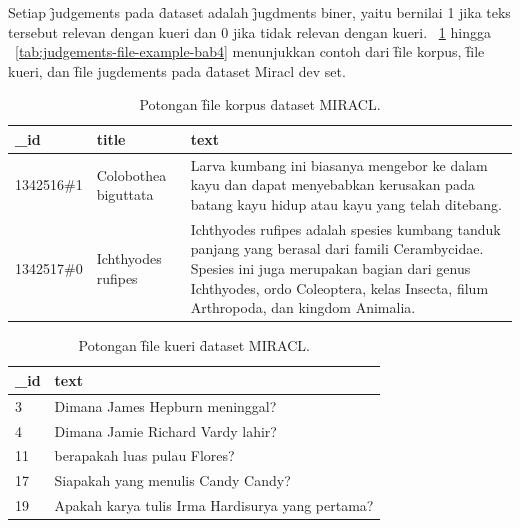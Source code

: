 Setiap \f{judgements} pada \f{dataset} adalah \f{jugdments} biner, yaitu bernilai 1 jika teks tersebut relevan dengan kueri dan 0 jika tidak relevan dengan kueri. \tab~\ref{tab:contoh-file-korpus-bab4} hingga \tab~\ref{tab:judgements-file-example-bab4} menunjukkan contoh dari \f{file} korpus, \f{file} kueri, dan \f{file jugdements} pada \f{dataset} Miracl dev set.
\begin{table}
    \centering
    \caption{Potongan \f{file} korpus \f{dataset} MIRACL.}
    \label{tab:contoh-file-korpus-bab4}
    \begin{tabular}{|l|l|p{}|}
        \hline
        \textbf{\_id}    & \textbf{title}             & \textbf{text}                                                                                                 \\ \hline
        1342516\#1  & Colobothea biguttata & Larva kumbang ini biasanya mengebor ke dalam kayu dan dapat menyebabkan kerusakan pada batang kayu hidup atau kayu yang telah ditebang. \\ \hline
        1342517\#0  & Ichthyodes rufipes  & Ichthyodes rufipes adalah spesies kumbang tanduk panjang yang berasal dari famili Cerambycidae. Spesies ini juga merupakan bagian dari genus Ichthyodes, ordo Coleoptera, kelas Insecta, filum Arthropoda, dan kingdom Animalia. \\ \hline
    \end{tabular}
\end{table}

\begin{table}
    \centering
    \caption{Potongan \f{file} kueri \f{dataset} MIRACL.}
    \label{tab:query-file-example-bab4}
    \begin{tabular}{|l|p{}|}
        \hline
        \textbf{\_id} & \textbf{text}                                                                 \\ \hline
        3             & Dimana James Hepburn meninggal?                                              \\ \hline
        4             & Dimana Jamie Richard Vardy lahir?                                            \\ \hline
        11            & berapakah luas pulau Flores?                                                 \\ \hline
        17            & Siapakah yang menulis Candy Candy?                                           \\ \hline
        19            & Apakah karya tulis Irma Hardisurya yang pertama?                              \\ \hline
    \end{tabular}
\end{table}

